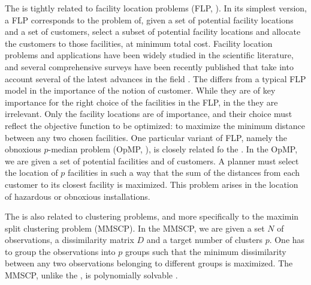 \documentclass[ijoo,nonblindrev]{informs-ijoo}
\begin{document}
The \pDP{} is tightly related to facility location problems (FLP, \citet{Laporte2015Location}). In its simplest version, a FLP corresponds to the problem of, given a set of potential facility locations and a set of customers, select a subset of potential facility locations and allocate the customers to those facilities, at minimum total cost. Facility location problems and applications have been widely studied in the scientific literature, and several comprehensive surveys have been recently published that take into account several of the latest advances in the field \citep{Laporte2015Location, Melo2009Facility}. The \pDP{} differs from a typical FLP model in the importance of the notion of customer. While they are of key importance for the right choice of the facilities in the FLP, in the \pDP{} they are irrelevant. Only the facility locations are of importance, and their choice must reflect the objective function to be optimized: to maximize the minimum distance between any two chosen facilities. One particular variant of FLP, namely the obnoxious $p$-median problem (OpMP, \citet{Belotti2006branch}), is closely related fo the \pDP{}. In the OpMP, we are given a set of potential facilities and of customers. A planner must select the location of $p$ facilities in such a way that the sum of the distances from each customer to its closest facility is maximized. This problem arises in the location of hazardous or obnoxious installations.

The \pDP{} is also related to clustering problems, and more specifically to the maximin split clustering problem (MMSCP). In the MMSCP, we are given a set $N$ of observations, a dissimilarity matrix $D$ and a target number of clusters $p$. One has to group the observations into $p$ groups such that the minimum dissimilarity between any two observations belonging to different groups is maximized. The MMSCP, unlike the \pDP{}, is polynomially solvable \citep{Delattre1980Bicriterion}.
\end{document}
